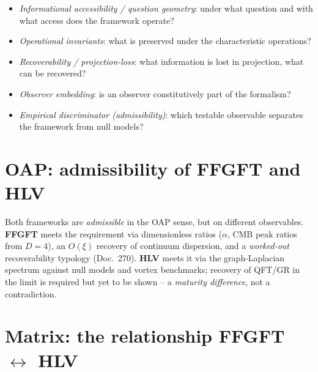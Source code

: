 \begin{itemize}
\item \emph{Informational accessibility / question geometry}: under what question and with what access does
the framework operate?
\item \emph{Operational invariants}: what is preserved under the characteristic operations?
\item \emph{Recoverability / projection-loss}: what information is lost in projection, what can be recovered?
\item \emph{Observer embedding}: is an observer constitutively part of the formalism?
\item \emph{Empirical discriminator (admissibility)}: which testable observable separates the framework from
null models?
\end{itemize}

\section{OAP: admissibility of FFGFT and HLV}

Both frameworks are \emph{admissible} in the OAP sense, but on different observables. \textbf{FFGFT} meets the
requirement via dimensionless ratios ($\alpha$, CMB peak ratios from $D=4$), an $O(\xi)$ recovery of continuum
dispersion, and a \emph{worked-out} recoverability typology (Doc.~270). \textbf{HLV} meets it via the
graph-Laplacian spectrum against null models and vortex benchmarks; recovery of QFT/GR in the limit is required
but yet to be shown -- a \emph{maturity difference}, not a contradiction.

\section{Matrix: the relationship FFGFT $\leftrightarrow$ HLV}

